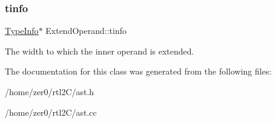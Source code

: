 \subsubsection{\texorpdfstring{tinfo}{tinfo}}
{\footnotesize\ttfamily \hyperlink{class_type_info}{Type\+Info}$\ast$ Extend\+Operand\+::tinfo\hspace{0.3cm}{\ttfamily [protected]}}

The width to which the inner operand is extended. 

The documentation for this class was generated from the following files\+:\begin{DoxyCompactItemize}
\item 
/home/zer0/rtl2\+C/ast.\+h\item 
/home/zer0/rtl2\+C/ast.\+cc\end{DoxyCompactItemize}
